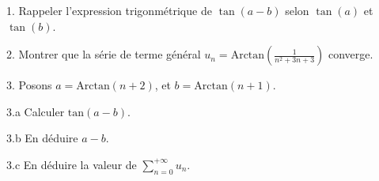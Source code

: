 \subetoiles
\columnbreak




1. Rappeler l'expression trigonmétrique de $\tan(a-b)$ selon $\tan(a)$ et $\tan(b)$.

\vspace{5pt}
2. Montrer que la série de terme général $\displaystyle u_n = \mathrm{Arctan}\left(\frac {1} {n^2 + 3n +3}\right)$ converge.

\vspace{5pt}
3. Posons $a = \mathrm{Arctan}(n+2)$, et $b = \mathrm{Arctan}(n+1)$.

\vspace{5pt}
\quad 3.a Calculer $\mathrm{tan}(a-b)$.

\vspace{5pt}
\quad 3.b En déduire $a-b$.

\vspace{5pt}
\quad 3.c En déduire la valeur de $\displaystyle \sum_{n=0}^{+\infty}u_n$.